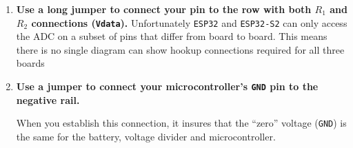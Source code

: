 \begin{enumerate}
	\item \textbf{Use a long jumper to connect your \adc pin to the row with both $R_1$ and $R_2$ connections (\texttt{Vdata}).}
	Unfortunately \texttt{ESP32} and \texttt{ESP32-S2} can only access the ADC on a subset of pins that differ from board to board. This means there is no single diagram can show hookup connections required for all three boards  

	\item \textbf{Use a jumper to connect your microcontroller's \texttt{GND} pin to the negative rail.}

	When you establish this connection, it insures that the ``zero'' voltage (\texttt{GND}) is the same for the battery, voltage divider and microcontroller.

\end{enumerate}

